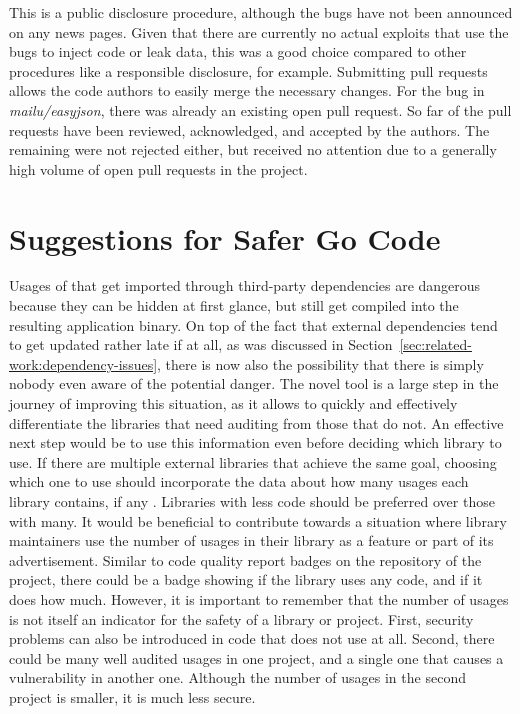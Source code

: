 

This is a public disclosure procedure, although the bugs have not been announced on any news pages.
Given that there are currently no actual exploits that use the bugs to inject code or leak data, this was a good choice
compared to other procedures like a responsible disclosure, for example.
Submitting \github{} pull requests allows the code authors to easily merge the necessary changes.
For the bug in \textit{mailu/easyjson}, there was already an existing open pull request.
So far \numberPRsMerged{} of the pull requests have been reviewed, acknowledged, and accepted by the authors.
The remaining were not rejected either, but received no attention due to a generally high volume of open pull requests
in the project.



\section{Suggestions for Safer Go Code}\label{sec:discussion:safer-go-code}

Usages of \unsafe{} that get imported through third-party dependencies are dangerous because they can be hidden at first
glance, but still get compiled into the resulting application binary.
On top of the fact that external dependencies tend to get updated rather late if at all, as was discussed in
Section~\ref{sec:related-work:dependency-issues}, there is now also the possibility that there is simply nobody even
aware of the potential danger.
The novel tool \toolGeiger{} is a large step in the journey of improving this situation, as it allows to quickly and
effectively differentiate the libraries that need auditing from those that do not.
An effective next step would be to use this information even before deciding which library to use.
If there are multiple external libraries that achieve the same goal, choosing which one to use should incorporate the
data about how many \unsafe{} usages each library contains, if any .
Libraries with less \unsafe{} code should be preferred over those with many.
It would be beneficial to contribute towards a situation where library maintainers use the number of \unsafe{} usages
in their library as a feature or part of its advertisement.
Similar to code quality report badges on the \github{} repository of the project, there could be a badge showing if the
library uses any \unsafe{} code, and if it does how much.
However, it is important to remember that the number of \unsafe{} usages is not itself an indicator for the safety of
a library or project.
First, security problems can also be introduced in code that does not use \unsafe{} at all.
Second, there could be many well audited \unsafe{} usages in one project, and a single one that causes a vulnerability
in another one.
Although the number of \unsafe{} usages in the second project is smaller, it is much less secure.

